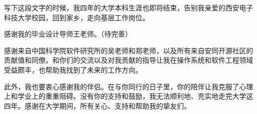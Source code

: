 \begin{thanksfor}
写下这段文字的时候，我四年的大学本科生涯也即将结束，告别我亲爱的西安电子科技大学校园，回到家乡，走向基层工作岗位。

感谢我的毕业设计导师王老师。（待完善）%

感谢来自中国科学院软件研究所的吴老师和郑老师，以及所有来自安同开源社区的贡献值和同僚。和你们的交流以及对我贡献的指导让我在操作系统和软件工程领域受益颇丰，也帮助我找到了未来的工作方向。

此外，我也要衷心感谢我的伴侣。在与你同行的日子里，你的陪伴让我克服了心理上和学业上的重重阻碍。没有你的支持和鼓励，我无法顺利地、充实地走完大学这四年。感谢在大学期间，所有关心、支持和帮助我的挚友们。
\end{thanksfor}
